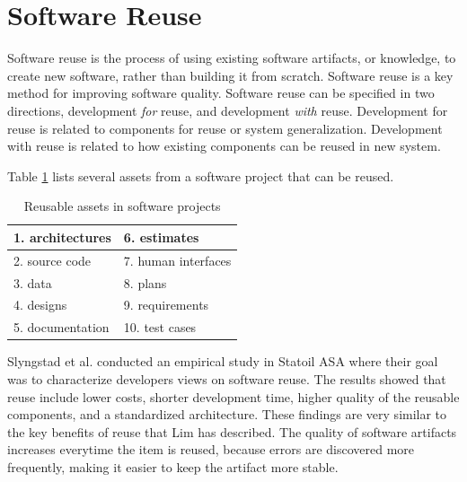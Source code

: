 

\section{Software Reuse}
Software reuse is the process of using existing software artifacts, or knowledge, to create new software, rather than building it from scratch. Software reuse is a key method for improving software quality\cite{frakes1996software}. Software reuse can be specified in two directions, development \textit{for} reuse, and development \textit{with} reuse\cite{Slyngstad:2006:ESD:1159733.1159770}. Development for reuse is related to components for reuse or system generalization. Development with reuse is related to how existing components can be reused in new system.

Table \ref{tab:reusableComponents} lists several assets from a software project that can be reused\cite{frakes1996software}.
\begin{table}[H]
	\centering
	\begin{tabular}{ | l | l |}
	\hline
	1. architectures & 6. estimates \\ \hline
	2. source code & 7. human interfaces \\ \hline
	3. data & 8. plans \\ \hline
	4. designs & 9. requirements \\ \hline
	5. documentation & 10. test cases \\
	\hline
	\end{tabular}
	\caption{Reusable assets in software projects} \label{tab:reusableComponents}
\end{table}

Slyngstad et al.\cite{Slyngstad:2006:ESD:1159733.1159770} conducted an empirical study in Statoil ASA where their goal was to characterize developers views on software reuse. The results showed that reuse include lower costs, shorter development time, higher quality of the reusable components, and a standardized architecture. These findings are very similar to the key benefits of reuse that Lim has described\cite{lim1994effects}. The quality of software artifacts increases everytime the item is reused, because errors are discovered more frequently, making it easier to keep the artifact more stable\cite{sametinger1997software}.

